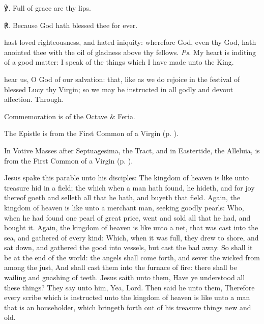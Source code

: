 ℣. Full of grace are thy lips.

℟. Because God hath blessed thee for ever.


\introit
{} hast loved righteousness, and hated iniquity: wherefore God, even thy God, hath anointed thee with the oil of gladness above thy fellows. \textit{Ps.} My heart is inditing of a good matter: I speak of the things which I have made unto the King.

\collect
{} hear us, O God of our salvation: that, like as we do rejoice in the festival of blessed Lucy thy Virgin; so we may be instructed in all godly and devout affection. Through.

\begin{rubric}
	Commemoration is of the Octave \& Feria.
\end{rubric}

\begin{rubric}
	The Epistle is from the First Common of a Virgin (p. \pageref{CommonVirginOnlyI}).
\end{rubric}


\begin{rubric}
	In Votive Masses after Septuagesima, the Tract, and in Eastertide, the Alleluia, is from the First Common of a Virgin (p. \pageref{CommonVirginOnlyI}).
\end{rubric}

 Jesus spake this parable unto his disciples: The kingdom of heaven is like unto treasure hid in a field; the which when a man hath found, he hideth, and for joy thereof goeth and selleth all that he hath, and buyeth that field. Again, the kingdom of heaven is like unto a merchant man, seeking goodly pearls: Who, when he had found one pearl of great price, went and sold all that he had, and bought it. Again, the kingdom of heaven is like unto a net, that was cast into the sea, and gathered of every kind: Which, when it was full, they drew to shore, and sat down, and gathered the good into vessels, but cast the bad away. So shall it be at the end of the world: the angels shall come forth, and sever the wicked from among the just, And shall cast them into the furnace of fire: there shall be wailing and gnashing of teeth. Jesus saith unto them, Have ye understood all these things? They say unto him, Yea, Lord. Then said he unto them, Therefore every scribe which is instructed unto the kingdom of heaven is like unto a man that is an householder, which bringeth forth out of his treasure things new and old.

